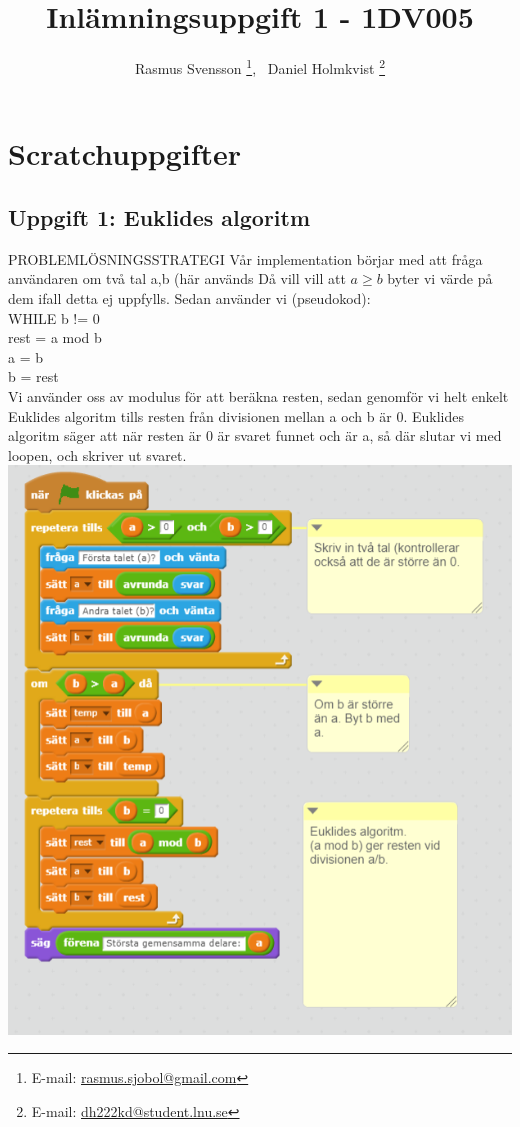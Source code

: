 \documentclass[12pt,a4paper]{article}
\begin{document}
\author{Rasmus Svensson%
  \thanks{E-mail: \href{mailto:rasmus.sjobol@gmail.com}{rasmus.sjobol@gmail.com}}, \ {Daniel Holmkvist%
  \thanks{E-mail: \href{mailto:dh222kd@student.lnu.se}{dh222kd@student.lnu.se}}}}
\title{Inlämningsuppgift 1 - 1DV005}
\maketitle
\tableofcontents
\newpage
\section{Scratchuppgifter}
\subsection{Uppgift 1: Euklides algoritm}
PROBLEMLÖSNINGSSTRATEGI 
Vår implementation börjar med att fråga användaren om två tal a,b (här används  Då vill vill att $ a \geq b$ byter vi värde på dem ifall detta ej uppfylls. Sedan använder vi (pseudokod): 
\\
WHILE b != 0         \\
 	rest = a mod b \\
	a = b \\
	b = rest \\ 
	
Vi använder oss av modulus för att beräkna resten, sedan genomför vi helt enkelt Euklides algoritm tills resten från divisionen mellan a och b är 0. Euklides algoritm säger att när resten är 0 är svaret funnet och är a, så där slutar vi med loopen, och skriver ut svaret. \\

\includegraphics[scale=0.85]{euklidesimpl}
\end{document}
